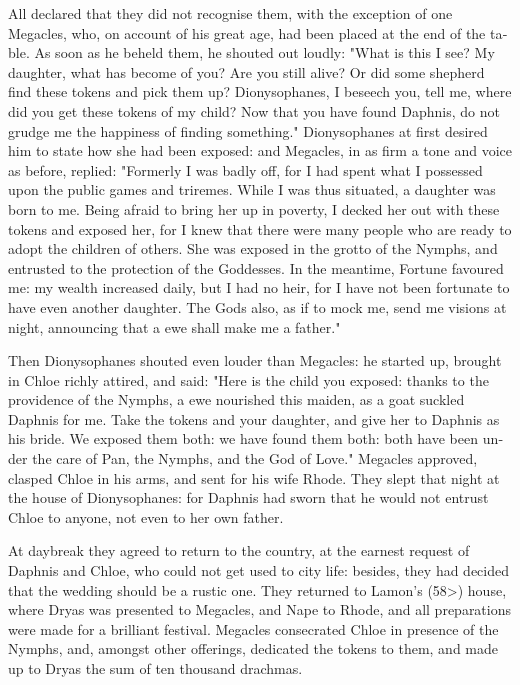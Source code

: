 \documentclass{book}
\begin{document}
\begin{pairs}
\begin{Rightside}
\begin{english}
  All declared that they did not recognise them, with the exception of one Megacles, who, on account of his great age, had been placed at the end of the table.  As soon as he beheld them, he shouted out loudly:  "What is this I see?  My daughter, what has become of you?  Are you still alive?  Or did some shepherd find these tokens and pick them up?  Dionysophanes, I beseech you, tell me, where did you get these tokens of my child?  Now that you have found Daphnis, do not grudge me the happiness of finding something."  Dionysophanes at first desired him to state how she had been exposed: and Megacles, in as firm a tone and voice as before, replied:  "Formerly I was badly off, for I had spent what I possessed upon the public games and triremes.  While I was thus situated, a daughter was born to me.  Being afraid to bring her up in poverty, I decked her out with these tokens and exposed her, for I knew that there were many people who are ready to adopt the children of others.  She was exposed in the grotto of the Nymphs, and entrusted to the protection of the Goddesses.  In the meantime, Fortune favoured me: my wealth increased daily, but I had no heir, for I have not been fortunate to have even another daughter.  The Gods also, as if to mock me, send me visions at night, announcing that a ewe shall make me a father."
\pend


  Then Dionysophanes shouted even louder than Megacles: he started up, brought in Chloe richly attired, and said: "Here is the child you exposed: thanks to the providence of the Nymphs, a ewe nourished this maiden, as a goat suckled Daphnis for me.  Take the tokens and your daughter, and give her to Daphnis as his bride.  We exposed them both: we have found them both: both have been under the care of Pan, the Nymphs, and the God of Love."  Megacles approved, clasped Chloe in his arms, and sent for his wife Rhode.  They slept that night at the house of Dionysophanes: for Daphnis had sworn that he would not entrust Chloe to anyone, not even to her own father.
\pend


  At daybreak they agreed to return to the country, at the earnest request of Daphnis and Chloe, who could not get used to city life: besides, they had decided that the wedding should be a rustic one.  They returned to Lamon's (58>) house, where Dryas was presented to Megacles, and Nape to Rhode, and all preparations were made for a brilliant festival.  Megacles consecrated Chloe in presence of the Nymphs, and, amongst other offerings, dedicated the tokens to them, and made up to Dryas the sum of ten thousand drachmas.
\pend



\end{english}
\end{Rightside}
\end{pairs}
\end{document}
